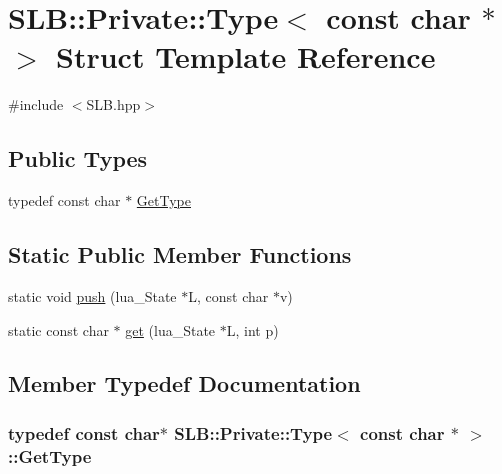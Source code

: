 \hypertarget{structSLB_1_1Private_1_1Type_3_01const_01char_01_5_01_4}{}\section{S\+LB\+:\+:Private\+:\+:Type$<$ const char $\ast$ $>$ Struct Template Reference}
\label{structSLB_1_1Private_1_1Type_3_01const_01char_01_5_01_4}


{\ttfamily \#include $<$S\+L\+B.\+hpp$>$}

\subsection*{Public Types}
\begin{DoxyCompactItemize}
\item 
typedef const char $\ast$ \hyperlink{structSLB_1_1Private_1_1Type_3_01const_01char_01_5_01_4_a913b5cb2570dd4cc109c35dc9bb80f84}{Get\+Type}
\end{DoxyCompactItemize}
\subsection*{Static Public Member Functions}
\begin{DoxyCompactItemize}
\item 
static void \hyperlink{structSLB_1_1Private_1_1Type_3_01const_01char_01_5_01_4_abfdd44358e48548ab738516a5e1e8e58}{push} (lua\+\_\+\+State $\ast$L, const char $\ast$v)
\item 
static const char $\ast$ \hyperlink{structSLB_1_1Private_1_1Type_3_01const_01char_01_5_01_4_a3f6871e68ec4a04386458383e0e2b187}{get} (lua\+\_\+\+State $\ast$L, int p)
\end{DoxyCompactItemize}


\subsection{Member Typedef Documentation}
\subsubsection[{\texorpdfstring{Get\+Type}{GetType}}]{\setlength{\rightskip}{0pt plus 5cm}typedef const char$\ast$ {\bf S\+L\+B\+::\+Private\+::\+Type}$<$ const char $\ast$ $>$\+::{\bf Get\+Type}}\hypertarget{structSLB_1_1Private_1_1Type_3_01const_01char_01_5_01_4_a913b5cb2570dd4cc109c35dc9bb80f84}{}\label{structSLB_1_1Private_1_1Type_3_01const_01char_01_5_01_4_a913b5cb2570dd4cc109c35dc9bb80f84}


